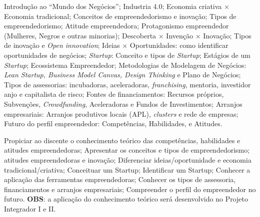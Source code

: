 
\begin{pud}
	
	
	\ementa
	Introdução ao ``Mundo dos Negócios''; Industria 4.0; Economia criativa $\times$ Economia tradicional; Conceitos de empreendedorismo e inovação; Tipos de empreendedorismo; Atitude empreendedora; Protagonismo empreendedor (Mulheres, Negros e outras minorias); Descoberta $\times$ Invenção $\times$ Inovação; Tipos de inovação e \textit{Open innovation}; Ideias $\times$ Oportunidades: como identificar oportunidades de negócios; \textit{Startup}: Conceito e tipos de \textit{Startup}; Estágios de um \textit{Startup}; Ecossistema Empreendedor; Metodologias de Modelagem de Negócios: \textit{Lean Startup, Business Model Canvas, Design Thinking} e Plano de Negócios; Tipos de assessorias: incubadoras, aceleradoras, \textit{franchising}, mentoria, investidor anjo e capitalista de risco; Fontes de financiamentos: Recursos próprios, Subvenções, \textit{Crowdfunding}, Aceleradoras e Fundos de Investimentos; Arranjos empresariais: Arranjos produtivos locais (APL), \textit{clusters} e rede de empresas; Futuro do perfil empreendedor: Competências, Habilidades, e Atitudes. 
	
	\objetivos
		Propiciar ao discente o conhecimento teórico das competências, habilidades e atitudes empreendedoras; 
		Apresentar os conceitos e tipos de empreendedorismo; atitudes empreendedoras e inovação;
		Diferenciar ideias/oportunidade e economia tradicional/criativa;
		Conceituar um Startup;
		Identificar um Startup;
		Conhecer a aplicação das ferramentas empreendedoras;
		Conhecer os tipos de assessoria, financiamentos e arranjos empresariais; 
		Compreender o perfil do empreendedor no futuro.
        \newline
        \textbf{OBS}: a aplicação do conhecimento teórico será desenvolvido no Projeto Integrador I e II.
	

\end{pud}

